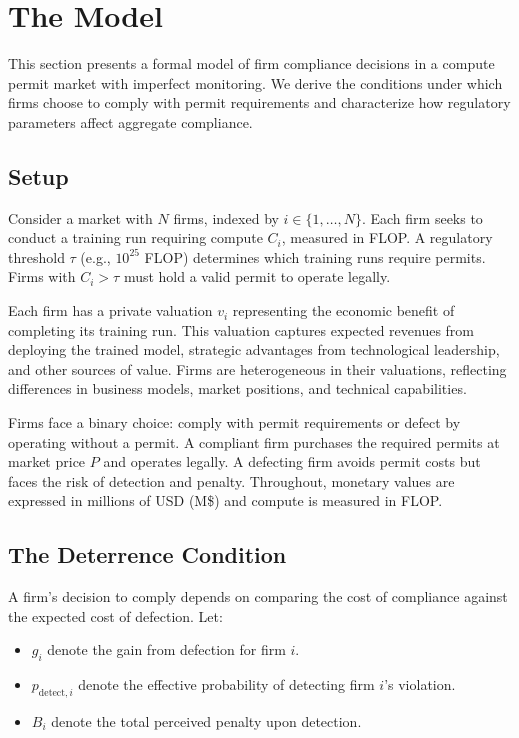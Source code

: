 
\section{The Model}

This section presents a formal model of firm compliance decisions in a compute permit market with imperfect monitoring. We derive the conditions under which firms choose to comply with permit requirements and characterize how regulatory parameters affect aggregate compliance.

\subsection{Setup}

Consider a market with $N$ firms, indexed by $i \in \{1, \ldots, N\}$. Each firm seeks to conduct a training run requiring compute $C_i$, measured in FLOP. A regulatory threshold $\tau$ (e.g., $10^{25}$ FLOP) determines which training runs require permits. Firms with $C_i > \tau$ must hold a valid permit to operate legally.

Each firm has a private valuation $v_i$ representing the economic benefit of completing its training run. This valuation captures expected revenues from deploying the trained model, strategic advantages from technological leadership, and other sources of value. Firms are heterogeneous in their valuations, reflecting differences in business models, market positions, and technical capabilities.

Firms face a binary choice: comply with permit requirements or defect by operating without a permit. A compliant firm purchases the required permits at market price $P$ and operates legally. A defecting firm avoids permit costs but faces the risk of detection and penalty. Throughout, monetary values are expressed in millions of USD (M\$) and compute is measured in FLOP.

\subsection{The Deterrence Condition}

A firm's decision to comply depends on comparing the cost of compliance against the expected cost of defection. Let:

\begin{itemize}
    \item $g_i$ denote the gain from defection for firm $i$.
    \item $p_{\mathrm{detect},i}$ denote the effective probability of detecting firm $i$'s violation.
    \item $B_i$ denote the total perceived penalty upon detection.
\end{itemize}


